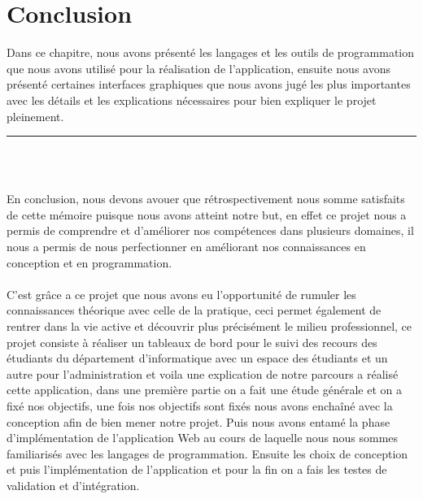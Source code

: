 \documentclass[12pt]{report}
\begin{document}
\section{Conclusion}
\vspace{0.1in}

Dans ce chapitre, nous avons présenté les langages et les outils de programmation que nous avons utilisé pour la réalisation de l'application, ensuite nous avons présenté certaines interfaces graphiques que nous avons jugé les plus importantes avec les détails et les explications nécessaires pour bien expliquer le projet pleinement.

\newpage

\vspace*{-0.2in}

\begin{center}
    {\color{Blue} \rule{5.5in}{1.4mm} }\\
    \vspace{0.1in}
    \scshape{\fontsize{34}{46}{\bfseries{\color{Blue}{Conclusion générale}}}}
    \\
    \vspace{0.5in}
\end{center}

En conclusion, nous devons avouer que rétrospectivement nous somme satisfaits de cette mémoire puisque nous avons atteint notre but, en effet ce projet nous a permis de comprendre et d'améliorer nos compétences dans plusieurs domaines, il nous a permis de nous perfectionner en améliorant nos connaissances en conception et en programmation.
\\\\
C'est grâce a ce projet que nous avons eu l'opportunité de rumuler les connaissances théorique avec celle de la pratique, ceci permet également de rentrer dans la vie active et découvrir plus précisément le milieu professionnel, ce projet consiste à réaliser un tableaux de bord pour le suivi des recours des étudiants du département d’informatique avec un espace des étudiants et un autre pour l’administration et voila une explication de notre parcours a réalisé cette application, dans une première partie on a fait une étude générale et on a fixé nos objectifs, une fois nos objectifs sont fixés nous avons enchaîné avec la conception afin de bien mener notre projet. Puis nous avons entamé la phase d’implémentation de l’application Web au cours de laquelle nous nous sommes familiarisés avec les langages de programmation. Ensuite les choix de conception et puis l'impl\'ementation de l’application et pour la fin on a fais les testes de validation et d'intégration.

\newpage


\def\thispagestyle#1{}


\end{document}
